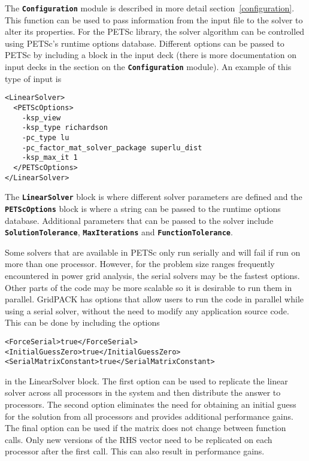 The \texttt{\textbf{Configuration}} module is described in more detail
section~\ref{configuration}. This function can be used to pass information from the input file to the solver to alter its properties. For the PETSc library, the solver algorithm can be controlled using PETSc's runtime options database. Different options can be passed to PETSc by including a block in the input deck (there is more documentation on input decks in the section on the \texttt{\textbf{Configuration}} module). An example of this type of input is

{
\color{blue}
\begin{Verbatim}[fontseries=b]
<LinearSolver>
  <PETScOptions>
    -ksp_view
    -ksp_type richardson
    -pc_type lu
    -pc_factor_mat_solver_package superlu_dist
    -ksp_max_it 1
  </PETScOptions>
</LinearSolver>
\end{Verbatim}
}

The \texttt{\textbf{LinearSolver}} block is where different solver parameters are defined and the \texttt{\textbf{PETScOptions}} block is where a string can be passed to the runtime options database. Additional parameters that can be passed to the solver include \texttt{\textbf{SolutionTolerance}}, \texttt{\textbf{MaxIterations}} and \texttt{\textbf{FunctionTolerance}}. 

Some solvers that are available in PETSc only run serially and will fail if run on more than one processor. However, for the problem size ranges frequently encountered in power grid analysis, the serial solvers may be the fastest options. Other parts of the code may be more scalable so it is desirable to run them in parallel. GridPACK has options that allow users to run the code in parallel while using a serial solver, without the need to modify any application source code. This can be done by including the options

{
\color{blue}
\begin{Verbatim}[fontseries=b]
<ForceSerial>true</ForceSerial>
<InitialGuessZero>true</InitialGuessZero>
<SerialMatrixConstant>true</SerialMatrixConstant>
\end{Verbatim}
}

in the LinearSolver block. The first option can be used to replicate the linear solver across all processors in the system and then distribute the answer to processors. The second option eliminates the need for obtaining an initial guess for the solution from all processors and provides additional performance gains. The final option can be used if the matrix does not change between function calls. Only new versions of the RHS vector need to be replicated on each processor after the first call. This can also result in performance gains.

